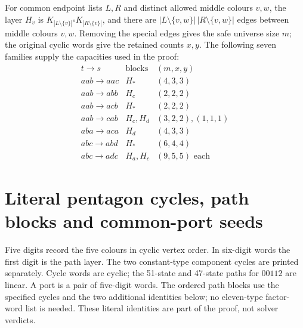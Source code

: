 \documentclass[11pt]{article}
\numberwithin{equation}{section}
\numberwithin{table}{section}
\begin{document}
For common endpoint lists $L,R$ and distinct allowed middle colours $v,w$,
the layer $H_v$ is
$K_{|L\setminus\{v\}|}\square K_{|R\setminus\{v\}|}$, and there are
$|L\setminus\{v,w\}|\,|R\setminus\{v,w\}|$ edges between middle
colours $v,w$. Removing the special edges gives the safe universe
size $m$; the original cyclic words give the retained counts $x,y$.
The following seven families supply the capacities used in the proof:
\[
\begin{array}{c|c|c}
t\to s&\text{blocks}&(m,x,y)\\\hline
aab\to aac&H_*&(4,3,3)\\
aab\to abb&H_c&(2,2,2)\\
aab\to acb&H_*&(2,2,2)\\
aab\to cab&H_c,H_d&(3,2,2),(1,1,1)\\
aba\to aca&H_d&(4,3,3)\\
abc\to abd&H_*&(6,4,4)\\
abc\to adc&H_a,H_c&(9,5,5)\text{ each}
\end{array}
\]
\section{Literal pentagon cycles, path blocks and common-port seeds}
\label{app:pentagon-factor-words}
Five digits record the five colours in cyclic vertex order. In six-digit
words the first digit is the path layer. The two constant-type component
cycles are printed separately. Cycle words are cyclic; the
51-state and 47-state paths for $00112$ are linear.
A port is a pair of five-digit words.
The ordered path blocks use the specified cycles and the two
additional identities below; no eleven-type factor-word list is needed.
These literal identities are part of the proof, not solver verdicts.
\end{document}
